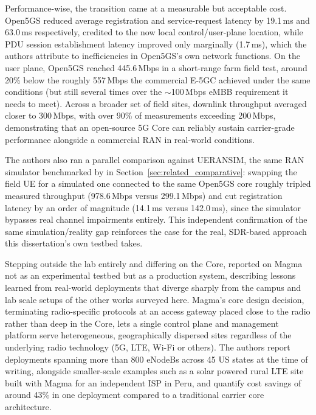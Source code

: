 Performance-wise, the transition came at a measurable but acceptable cost. Open5GS reduced average registration and service-request latency by 19.1\,ms and 63.0\,ms respectively, credited to the now local control/user-plane location, while \gls{PDU} session establishment latency improved only marginally (1.7\,ms), which the authors attribute to inefficiencies in Open5GS's own network functions. On the user plane, Open5GS reached 445.6\,Mbps in a short-range farm field test, around 20\% below the roughly 557\,Mbps the commercial E-5GC achieved under the same conditions (but still several times over the $\sim$100\,Mbps \gls{eMBB} requirement it needs to meet). Across a broader set of field sites, downlink throughput averaged closer to 300\,Mbps, with over 90\% of measurements exceeding 200\,Mbps, demonstrating that an open-source 5G Core can reliably sustain carrier-grade performance alongside a commercial \gls{RAN} in real-world conditions.

The authors also ran a parallel comparison against UERANSIM, the same \gls{RAN} simulator benchmarked by \textcite{rouili2024evaluating} in Section~\ref{sec:related_comparative}: swapping the field \gls{UE} for a simulated one connected to the same Open5GS core roughly tripled measured throughput (978.6\,Mbps versus 299.1\,Mbps) and cut registration latency by an order of magnitude (14.1\,ms versus 142.0\,ms), since the simulator bypasses real channel impairments entirely. This independent confirmation of the same simulation/reality gap reinforces the case for the real, \gls{SDR}-based approach this dissertation's own testbed takes.

Stepping outside the lab entirely and differing on the Core, \textcite{hasan2023building} reported on Magma not as an experimental testbed but as a production system, describing lessons learned from real-world deployments that diverge sharply from the campus and lab scale setups of the other works surveyed here. Magma's core design decision, terminating radio-specific protocols at an access gateway placed close to the radio rather than deep in the Core, lets a single control plane and management platform serve heterogeneous, geographically dispersed sites regardless of the underlying radio technology (5G, \gls{LTE}, Wi-Fi or others). The authors report deployments spanning more than 800 eNodeBs across 45 US states at the time of writing, alongside smaller-scale examples such as a solar powered rural \gls{LTE} site built with Magma for an independent ISP in Peru, and quantify cost savings of around 43\% in one deployment compared to a traditional carrier core architecture.

